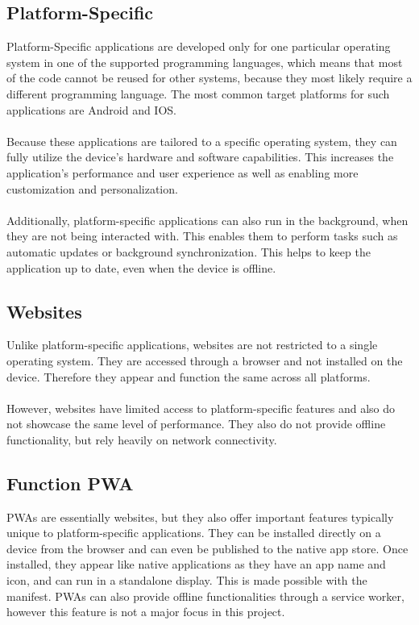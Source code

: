 \documentclass[a4paper,12pt]{report}
\begin{document}
\subsection{Platform-Specific}
Platform-Specific applications are developed only for one particular operating system in one of the supported programming languages, which means that most of the code cannot be reused for other systems, because they most likely require a different programming language. The most common target platforms for such applications are Android and IOS. \\\\
Because these applications are tailored to a specific operating system, they can fully utilize the device’s hardware and software capabilities. This increases the application's performance and user experience as well as enabling more customization and personalization. \parencite{native-apps} \\\\
Additionally, platform-specific applications can also run in the background, when they are not being interacted with. This enables them to perform tasks such as automatic updates or background synchronization. This helps to keep the application up to date, even when the device is offline. \parencite{mdn-pwa} \\
\subsection{Websites}
Unlike platform-specific applications, websites are not restricted to a single operating system. They are accessed through a browser and not installed on the device. Therefore they appear and function the same across all platforms. \parencite{mdn-pwa} \\\\
However, websites have limited access to platform-specific features and also do not showcase the same level of performance. They also do not provide offline functionality, but rely heavily on network connectivity. \\
\subsection{Function PWA}
PWAs are essentially websites, but they also offer important features typically unique to platform-specific applications. They can be installed directly on a device from the browser and can even be published to the native app store. Once installed, they appear like native applications as they have an app name and icon, and can run in a standalone display. This is made possible with the manifest. PWAs can also provide offline functionalities through a service worker, however this feature is not a major focus in this project. \parencite{mdn-pwa}
\end{document}
